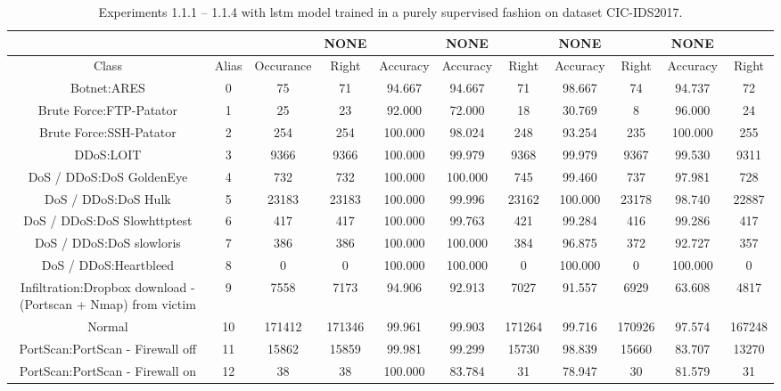 \begin{table}[htb]
    \centering
    \caption{Experiments 1.1.1 – 1.1.4 with \gls{lstm} model trained in a purely supervised fashion on dataset CIC-IDS2017.}
    \label{table:results:lstm:flows_supervised}
    \begin{tabular}{@{}ccccccccccc@{}}
        \toprule
         &  &  & NONE &  & NONE &  & NONE &  & NONE &  \\
        \midrule
        Class &  Alias &  Occurance &  Right &  Accuracy &  Accuracy &  Right &  Accuracy &  Right &  Accuracy &  Right \\
        Botnet:ARES &  0 &  75 &  71 &  94.667 &  94.667 &  71 &  98.667 &  74 &  94.737 &  72 \\
        Brute Force:FTP-Patator &  1 &  25 &  23 &  92.000 &  72.000 &  18 &  30.769 &  8 &  96.000 &  24 \\
        Brute Force:SSH-Patator &  2 &  254 &  254 &  100.000 &  98.024 &  248 &  93.254 &  235 &  100.000 &  255 \\
        DDoS:LOIT &  3 &  9366 &  9366 &  100.000 &  99.979 &  9368 &  99.979 &  9367 &  99.530 &  9311 \\
        DoS / DDoS:DoS GoldenEye &  4 &  732 &  732 &  100.000 &  100.000 &  745 &  99.460 &  737 &  97.981 &  728 \\
        DoS / DDoS:DoS Hulk &  5 &  23183 &  23183 &  100.000 &  99.996 &  23162 &  100.000 &  23178 &  98.740 &  22887 \\
        DoS / DDoS:DoS Slowhttptest &  6 &  417 &  417 &  100.000 &  99.763 &  421 &  99.284 &  416 &  99.286 &  417 \\
        DoS / DDoS:DoS slowloris &  7 &  386 &  386 &  100.000 &  100.000 &  384 &  96.875 &  372 &  92.727 &  357 \\
        DoS / DDoS:Heartbleed &  8 &  0 &  0 &  100.000 &  100.000 &  0 &  100.000 &  0 &  100.000 &  0 \\
        Infiltration:Dropbox download - (Portscan + Nmap) from victim &  9 &  7558 &  7173 &  94.906 &  92.913 &  7027 &  91.557 &  6929 &  63.608 &  4817 \\
        Normal &  10 &  171412 &  171346 &  99.961 &  99.903 &  171264 &  99.716 &  170926 &  97.574 &  167248 \\
        PortScan:PortScan - Firewall off &  11 &  15862 &  15859 &  99.981 &  99.299 &  15730 &  98.839 &  15660 &  83.707 &  13270 \\
        PortScan:PortScan - Firewall on &  12 &  38 &  38 &  100.000 &  83.784 &  31 &  78.947 &  30 &  81.579 &  31 \\

\end{tabular}
\end{table}
